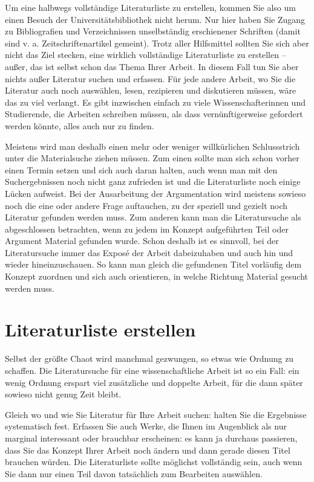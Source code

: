 \documentclass[]{book}
\theoremstyle{definition}
\theoremstyle{definition}
\theoremstyle{definition}
\theoremstyle{remark}
\begin{document}
Um eine halbwegs vollständige Literaturliste zu erstellen, kommen Sie
also um einen Besuch der Universitätsbibliothek nicht herum. Nur hier
haben Sie Zugang zu Bibliografien und Verzeichnissen unselbständig
erschienener Schriften (damit sind v. a. Zeitschriftenartikel gemeint).
Trotz aller Hilfsmittel sollten Sie sich aber nicht das Ziel stecken,
eine wirklich vollständige Literaturliste zu erstellen -- außer, das ist
selbst schon das Thema Ihrer Arbeit. In diesem Fall tun Sie aber nichts
außer Literatur suchen und erfassen. Für jede andere Arbeit, wo Sie die
Literatur auch noch auswählen, lesen, rezipieren und diskutieren müssen,
wäre das zu viel verlangt. Es gibt inzwischen einfach zu viele
Wissenschafterinnen und Studierende, die Arbeiten schreiben müssen, als
dass vernünftigerweise gefordert werden könnte, alles auch nur zu
finden.

Meistens wird man deshalb einen mehr oder weniger willkürlichen
Schlussstrich unter die Materialsuche ziehen müssen. Zum einen sollte
man sich schon vorher einen Termin setzen und sich auch daran halten,
auch wenn man mit den Suchergebnissen noch nicht ganz zufrieden ist und
die Literaturliste noch einige Lücken aufweist. Bei der Ausarbeitung der
Argumentation wird meistens sowieso noch die eine oder andere Frage
auftauchen, zu der speziell und gezielt noch Literatur gefunden werden
muss. Zum anderen kann man die Literatursuche als abgeschlossen
betrachten, wenn zu jedem im Konzept aufgeführten Teil oder Argument
Material gefunden wurde. Schon deshalb ist es sinnvoll, bei der
Literatursuche immer das Exposé der Arbeit dabeizuhaben und auch hin und
wieder hineinzuschauen. So kann man gleich die gefundenen Titel
vorläufig dem Konzept zuordnen und sich auch orientieren, in welche
Richtung Material gesucht werden muss.

\section{Literaturliste erstellen}\label{literaturliste-erstellen}

Selbst der größte Chaot wird manchmal gezwungen, so etwas wie Ordnung zu
schaffen. Die Literatursuche für eine wissenschaftliche Arbeit ist so
ein Fall: ein wenig Ordnung erspart viel zusätzliche und doppelte
Arbeit, für die dann später sowieso nicht genug Zeit bleibt.

Gleich wo und wie Sie Literatur für Ihre Arbeit suchen: halten Sie die
Ergebnisse systematisch fest. Erfassen Sie auch Werke, die Ihnen im
Augenblick als nur marginal interessant oder brauchbar erscheinen: es
kann ja durchaus passieren, dass Sie das Konzept Ihrer Arbeit noch
ändern und dann gerade diesen Titel brauchen würden. Die Literaturliste
sollte möglichst vollständig sein, auch wenn Sie dann nur einen Teil
davon tatsächlich zum Bearbeiten auswählen.
\end{document}

